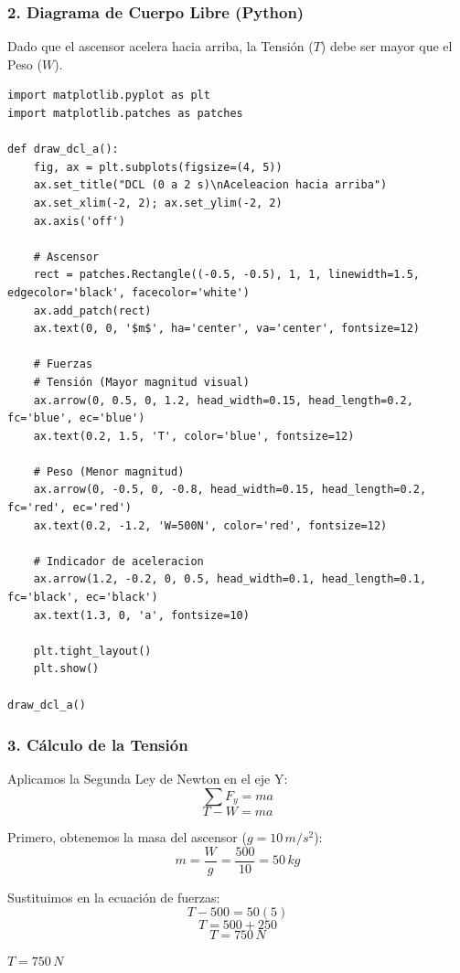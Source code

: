 \documentclass[12pt, a4paper]{article}
\begin{document}
\subsubsection*{2. Diagrama de Cuerpo Libre (Python)}
Dado que el ascensor acelera hacia arriba, la Tensión ($T$) debe ser mayor que el Peso ($W$).

\begin{lstlisting}
import matplotlib.pyplot as plt
import matplotlib.patches as patches

def draw_dcl_a():
    fig, ax = plt.subplots(figsize=(4, 5))
    ax.set_title("DCL (0 a 2 s)\nAceleacion hacia arriba")
    ax.set_xlim(-2, 2); ax.set_ylim(-2, 2)
    ax.axis('off')
    
    # Ascensor
    rect = patches.Rectangle((-0.5, -0.5), 1, 1, linewidth=1.5, edgecolor='black', facecolor='white')
    ax.add_patch(rect)
    ax.text(0, 0, '$m$', ha='center', va='center', fontsize=12)
    
    # Fuerzas
    # Tensión (Mayor magnitud visual)
    ax.arrow(0, 0.5, 0, 1.2, head_width=0.15, head_length=0.2, fc='blue', ec='blue')
    ax.text(0.2, 1.5, 'T', color='blue', fontsize=12)
    
    # Peso (Menor magnitud)
    ax.arrow(0, -0.5, 0, -0.8, head_width=0.15, head_length=0.2, fc='red', ec='red')
    ax.text(0.2, -1.2, 'W=500N', color='red', fontsize=12)
    
    # Indicador de aceleracion
    ax.arrow(1.2, -0.2, 0, 0.5, head_width=0.1, head_length=0.1, fc='black', ec='black')
    ax.text(1.3, 0, 'a', fontsize=10)

    plt.tight_layout()
    plt.show()

draw_dcl_a()
\end{lstlisting}

\subsubsection*{3. Cálculo de la Tensión}
Aplicamos la Segunda Ley de Newton en el eje Y:
$$ \sum F_y = m a $$
$$ T - W = m a $$

Primero, obtenemos la masa del ascensor ($g=10\,\si{m/s^2}$):
$$ m = \frac{W}{g} = \frac{500}{10} = 50 \, \si{kg} $$

Sustituimos en la ecuación de fuerzas:
$$ T - 500 = 50(5) $$
$$ T = 500 + 250 $$
$$ \boxed{T = 750 \, \si{N}} $$

\begin{tcolorbox}[colback=green!5!white, colframe=green!50!black, title=Respuesta Final]
\centering \Large $T = 750 \, \si{N}$
\end{tcolorbox}
\end{document}
